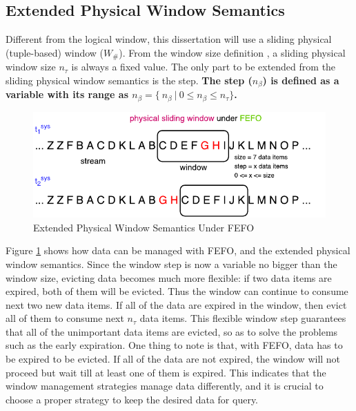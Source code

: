 \subsection{Extended Physical Window Semantics}
Different from the logical window, this dissertation will use a sliding physical (tuple-based) window ($W_{\#}$).
From the window size definition \cite{tangwongsan2015general}, a sliding physical window size $n_{\tau}$ is always a fixed value.
The only part to be extended from the sliding physical window semantics is the step. 
\textbf{The step ($n_{\beta}$) is defined as a variable with its range as ${n_{\beta} = \{\ n_{\beta} \ |\ 0 \leq n_{\beta} \leq n_{\tau}}\}$.}

\begin{figure}[!htbp]
	\centering
    \includegraphics[width=5in]{img/3-psewstu.pdf}
    \caption{Extended Physical Window Semantics Under FEFO}
    \label{fig:3-psewstu}
\end{figure}

Figure \ref{fig:3-psewstu} shows how data can be managed with FEFO, and the extended physical window semantics. 
Since the window step is now a variable no bigger than the window size, evicting data becomes much more flexible: if two data items are expired, both of them will be evicted. 
Thus the window can continue to consume next two new data items. 
If all of the data are expired in the window, then evict all of them to consume next $n_{\tau}$ data items. 
This flexible window step guarantees that all of the unimportant data items are evicted, so as to solve the problems such as the early expiration. 
One thing to note is that, with FEFO, data has to be expired to be evicted.
If all of the data are not expired, the window will not proceed but wait till at least one of them is expired. 
This indicates that the window management strategies manage data differently, and it is crucial to choose a proper strategy to keep the desired data for query.
%

